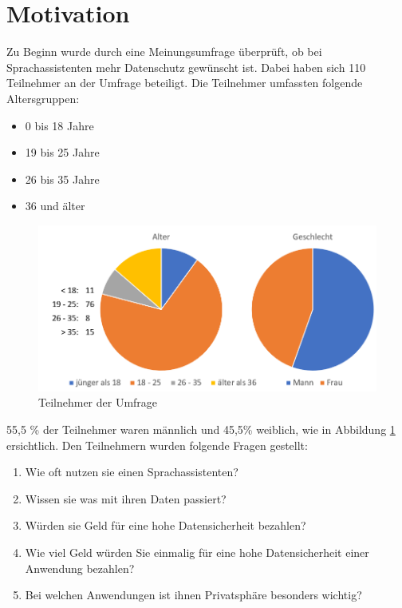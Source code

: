 \section{Motivation}\label{sec:motivaiton}
Zu Beginn wurde durch eine Meinungsumfrage überprüft, ob bei Sprachassistenten mehr Datenschutz gewünscht ist. Dabei haben sich 110 Teilnehmer an der Umfrage beteiligt. Die Teilnehmer umfassten folgende Altersgruppen:
\begin{itemize}
	\item 0 bis 18 Jahre 
	\item 19 bis 25 Jahre
	\item 26 bis 35 Jahre
	\item 36 und älter	
\end{itemize}

\begin{figure}[h]
	\centering
	\includegraphics[width=0.9\linewidth]{Picture/umfrage_teilnehmer}
	\caption[Teilnehmer der Umfrage]{Teilnehmer der Umfrage}
	\label{fig:umfrage_teilnehmer}
\end{figure}

55,5 \% der Teilnehmer waren männlich und 45,5\%  weiblich, wie in Abbildung \ref{fig:umfrage_teilnehmer} ersichtlich. Den Teilnehmern wurden folgende Fragen gestellt:

\begin{enumerate}	
	\item Wie oft nutzen sie einen Sprachassistenten?
	\item Wissen sie was mit ihren Daten passiert?
	\item Würden sie Geld für eine hohe Datensicherheit bezahlen?
	\item Wie viel Geld würden Sie einmalig für eine hohe Datensicherheit einer Anwendung bezahlen?
	\item Bei welchen Anwendungen ist ihnen Privatsphäre besonders wichtig?	
\end{enumerate}

